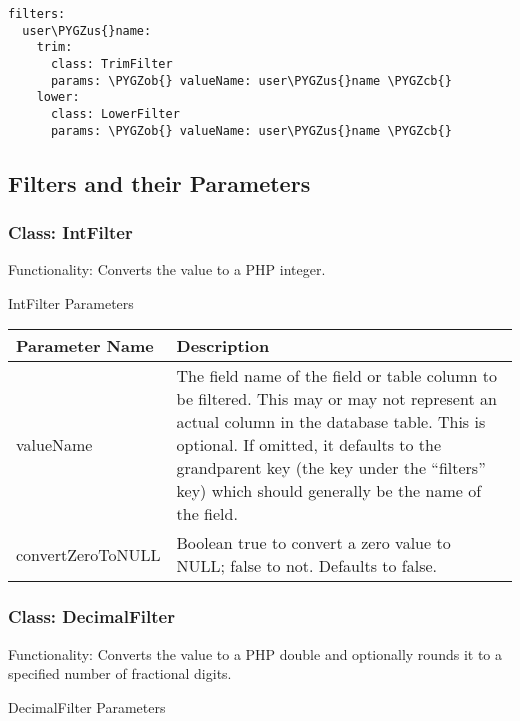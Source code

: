 \documentclass[letterpaper,10pt,english]{sphinxmanual}
\def\PYGZus{\char`\_}
\def\PYGZob{\char`\{}
\def\PYGZcb{\char`\}}
\begin{document}
\begin{Verbatim}[commandchars=\\\{\}]
filters:
  user\PYGZus{}name:
    trim:
      class: TrimFilter
      params: \PYGZob{} valueName: user\PYGZus{}name \PYGZcb{}
    lower:
      class: LowerFilter
      params: \PYGZob{} valueName: user\PYGZus{}name \PYGZcb{}
\end{Verbatim}


\subsection{Filters and their Parameters}
\label{jaxFrameworkGuide:filters-and-their-parameters}

\subsubsection{Class: IntFilter}
\label{jaxFrameworkGuide:class-intfilter}
Functionality: Converts the value to a PHP integer.

IntFilter Parameters

\begin{tabulary}{\linewidth}{|L|L|}
\hline
\textsf{\relax 
Parameter Name
} & \textsf{\relax 
Description
}\\
\hline
valueName
 & 
The field name of the field or table column to be filtered.  This may or may not
represent an actual column in the database table.  This is optional.  If omitted,
it defaults to the grandparent key (the key under the ``filters'' key) which should
generally be the name of the field.
\\
\hline
convertZeroToNULL
 & 
Boolean true to convert a zero value to NULL; false to not.  Defaults to false.
\\
\hline\end{tabulary}



\subsubsection{Class: DecimalFilter}
\label{jaxFrameworkGuide:class-decimalfilter}
Functionality: Converts the value to a PHP double and optionally rounds it to a specified number of
fractional digits.

DecimalFilter Parameters
\end{document}
